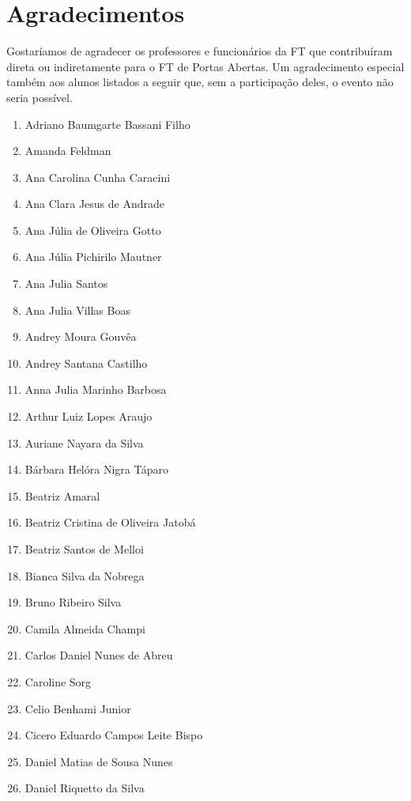 \documentclass[
  letterpaper,
  DIV=11,
  numbers=noendperiod]{scrreprt}
\providecommand{\tightlist}{%
  \setlength{\itemsep}{0pt}\setlength{\parskip}{0pt}}\usepackage{longtable,booktabs,array}
\begin{document}

\chapter{Agradecimentos}\label{agradecimentos}

Gostaríamos de agradecer os professores e funcionários da FT que
contribuíram direta ou indiretamente para o FT de Portas Abertas. Um
agradecimento especial também aos alunos listados a seguir que, sem a
participação deles, o evento não seria possível.

\begin{enumerate}
\def\labelenumi{\arabic{enumi}.}
\tightlist
\item
  Adriano Baumgarte Bassani Filho
\item
  Amanda Feldman
\item
  Ana Carolina Cunha Caracini
\item
  Ana Clara Jesus de Andrade
\item
  Ana Júlia de Oliveira Gotto
\item
  Ana Júlia Pichirilo Mautner
\item
  Ana Julia Santos
\item
  Ana Julia Villas Boas
\item
  Andrey Moura Gouvêa
\item
  Andrey Santana Castilho
\item
  Anna Julia Marinho Barbosa
\item
  Arthur Luiz Lopes Araujo
\item
  Auriane Nayara da Silva
\item
  Bárbara Helóra Nigra Táparo
\item
  Beatriz Amaral
\item
  Beatriz Cristina de Oliveira Jatobá
\item
  Beatriz Santos de Melloi
\item
  Bianca Silva da Nobrega
\item
  Bruno Ribeiro Silva
\item
  Camila Almeida Champi
\item
  Carlos Daniel Nunes de Abreu
\item
  Caroline Sorg
\item
  Celio Benhami Junior
\item
  Cicero Eduardo Campos Leite Bispo
\item
  Daniel Matias de Sousa Nunes
\item
  Daniel Riquetto da Silva

\end{enumerate}
\end{document}
